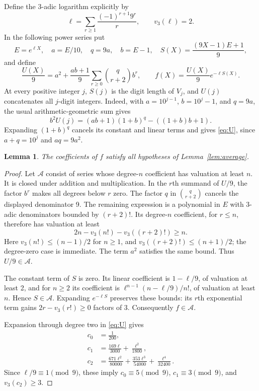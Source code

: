 \documentclass[10pt]{article}
\newtheorem{lemma}{Lemma}
\begin{document}
Define the 3-adic logarithm explicitly by
\[
 \ell=\sum_{r\ge1}\frac{(-1)^{r+1}9^r}{r},\qquad v_3(\ell)=2.
\]
In the following power series put
\[
 E=e^{\ell X},\quad a=E/10,\quad q=9a,\quad b=E-1,\quad
 S(X)=\frac{(9X-1)E+1}{9},
\]
and define
\begin{equation}\label{eq:U}
 \frac{U(X)}9=a^2+
 \frac{ab+1}{9}\sum_{r\ge0}\binom q{r+2}b^r,
 \qquad f(X)=\frac{U(X)}9e^{-\ell S(X)}.
\end{equation}
At every positive integer $j$, $S(j)$ is the digit length of $V_j$,
and $U(j)$ concatenates all $j$-digit integers. Indeed, with
$a=10^{j-1}$, $b=10^j-1$, and $q=9a$, the usual arithmetic-geometric sum gives
\[
 b^2U(j)=(ab+1)(1+b)^q-((1+b)b+1).
\]
Expanding $(1+b)^q$ cancels its constant and linear terms and gives
\eqref{eq:U}, since $a+q=10^j$ and $aq=9a^2$.

\begin{lemma}\label{lem:coefficients}
The coefficients of $f$ satisfy all hypotheses of Lemma~\ref{lem:average}.
\end{lemma}
\begin{proof}
Let $\mathcal A$ consist of series whose degree-$n$ coefficient has
valuation at least $n$. It is closed under addition and multiplication.
In the $r$th summand of $U/9$, the factor $b^r$ makes all degrees below $r$
zero. The factor $q$ in $\binom q{r+2}$ cancels the displayed denominator 9.
The remaining expression is a polynomial in $E$ with 3-adic denominators
bounded by $(r+2)!$. Its degree-$n$ coefficient, for $r\le n$, therefore has
valuation at least
\[
 2n-v_3(n!)-v_3((r+2)!)\ge n.
\]
Here $v_3(n!)\le(n-1)/2$ for $n\ge1$, and
$v_3((r+2)!)\le(n+1)/2$; the degree-zero case is immediate.
The term $a^2$ satisfies the same bound. Thus $U/9\in\mathcal A$.

The constant term of $S$ is zero. Its linear coefficient is $1-\ell/9$,
of valuation at least 2, and for $n\ge2$ its coefficient is
$\ell^{n-1}(n-\ell/9)/n!$, of valuation at least $n$.
Hence $S\in\mathcal A$. Expanding $e^{-\ell S}$ preserves these bounds:
its $r$th exponential term gains $2r-v_3(r!)\ge0$ factors of 3.
Consequently $f\in\mathcal A$.

Expansion through degree two in \eqref{eq:U} gives
\begin{align*}
 c_0&=\frac1{200},\\
 c_1&=\frac{169\ell}{3000}+\frac{\ell^2}{1800},\\
 c_2&=\frac{671\ell^2}{80000}
        +\frac{353\ell^3}{54000}+\frac{\ell^4}{32400}.
\end{align*}
Since $\ell/9\equiv1\pmod9$, these imply
$c_0\equiv5\pmod9$, $c_1\equiv3\pmod9$, and $v_3(c_2)\ge3$.
\end{proof}
\end{document}
